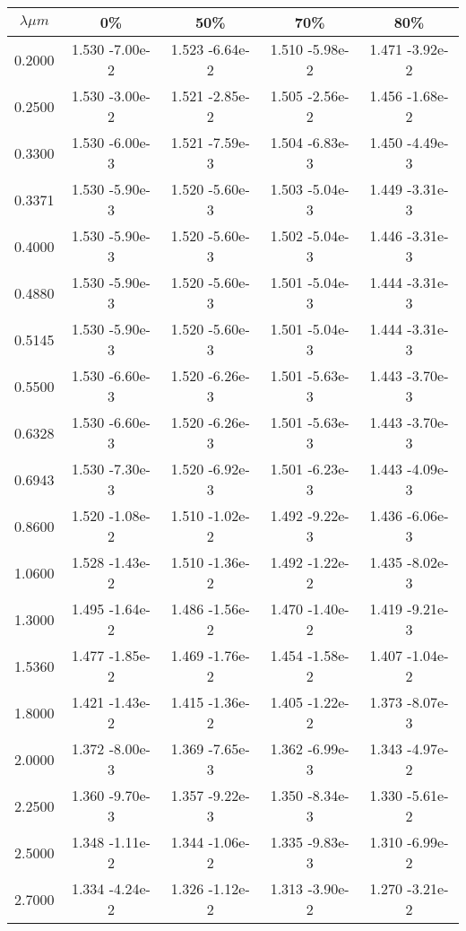 \documentclass[12pt]{article}
\begin{document}
\begin{center}
\begin{table}
\begin{tabular}{| c | c | c | c | c |  }
\hline
 $\lambda \mu m$ & 0\%  & 50\%  & 70\%  &  80\%  \\
\hline
0.2000 & 1.530 -7.00e-2  & 1.523 -6.64e-2 &     1.510 -5.98e-2 & 1.471 -3.92e-2 \\
0.2500  &  1.530 -3.00e-2  &  1.521 -2.85e-2  &  1.505 -2.56e-2  &  1.456 -1.68e-2   \\
0.3300  &  1.530 -6.00e-3  &  1.521 -7.59e-3 &   1.504 -6.83e-3  &  1.450 -4.49e-3  \\
0.3371  &  1.530 -5.90e-3  &  1.520 -5.60e-3  &  1.503 -5.04e-3   & 1.449 -3.31e-3 \\
0.4000 &   1.530 -5.90e-3  &  1.520 -5.60e-3  &  1.502 -5.04e-3  &  1.446 -3.31e-3 \\
0.4880  &  1.530 -5.90e-3  &  1.520 -5.60e-3  &  1.501 -5.04e-3  &  1.444 -3.31e-3 \\
0.5145  &  1.530 -5.90e-3 &   1.520 -5.60e-3  &  1.501 -5.04e-3  &  1.444 -3.31e-3  \\
0.5500  &  1.530 -6.60e-3  &  1.520 -6.26e-3  &  1.501 -5.63e-3  &  1.443 -3.70e-3  \\
0.6328  &  1.530 -6.60e-3 &   1.520 -6.26e-3  &  1.501 -5.63e-3  &  1.443 -3.70e-3  \\ 
0.6943 &   1.530 -7.30e-3 &   1.520 -6.92e-3  &   1.501 -6.23e-3 &   1.443 -4.09e-3  \\ 
0.8600 &   1.520 -1.08e-2  &  1.510 -1.02e-2  &  1.492 -9.22e-3  &  1.436 -6.06e-3  \\ 
1.0600  &  1.528 -1.43e-2  &  1.510 -1.36e-2  &  1.492 -1.22e-2  &  1.435 -8.02e-3  \\ 
1.3000  &  1.495 -1.64e-2  &  1.486 -1.56e-2  &  1.470 -1.40e-2  &  1.419 -9.21e-3  \\
1.5360  &  1.477 -1.85e-2  &  1.469 -1.76e-2  &  1.454 -1.58e-2  &  1.407 -1.04e-2 \\  
1.8000  &  1.421 -1.43e-2  &  1.415 -1.36e-2  &  1.405 -1.22e-2  &  1.373 -8.07e-3  \\ 
2.0000  &  1.372 -8.00e-3  &  1.369 -7.65e-3  &  1.362 -6.99e-3  &  1.343 -4.97e-2 \\  
2.2500 &  1.360 -9.70e-3   & 1.357 -9.22e-3   & 1.350 -8.34e-3  &  1.330 -5.61e-2  \\
2.5000  &  1.348 -1.11e-2  &  1.344 -1.06e-2  &  1.335 -9.83e-3  &  1.310 -6.99e-2 \\  
2.7000  &  1.334 -4.24e-2  &  1.326 -1.12e-2  &  1.313 -3.90e-2  &  1.270 -3.21e-2  \\ 

\end{tabular}
\end{table}
\end{center}
\end{document}
